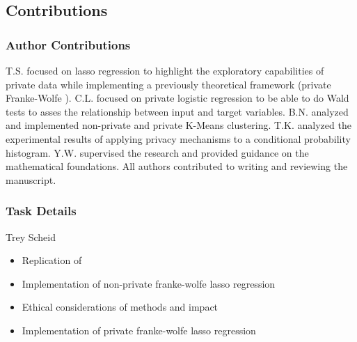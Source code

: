 \documentclass[12pt,letterpaper]{article}
\begin{document}




\clearpage
\makeappendix


\subsection{Contributions}

\subsubsection{Author Contributions}
T.S. focused on lasso regression to highlight the exploratory capabilities of private data while implementing a previously theoretical framework (private Franke-Wolfe \cite{NIPS2015_52d080a3}). C.L. focused on private logistic regression to be able to do Wald tests to asses the relationship between input and target variables. B.N. analyzed and implemented non-private and private K-Means clustering. T.K. analyzed the experimental results of applying privacy mechanisms to a conditional probability histogram. Y.W. supervised the research and provided guidance on the mathematical foundations. All authors contributed to writing and reviewing the manuscript.

\subsubsection{Task Details}

Trey Scheid
\begin{itemize}
    \item Replication of \cite{lassocarbon}
    \item Implementation of non-private franke-wolfe lasso regression
    \item Ethical considerations of methods and impact
    \item Implementation of private franke-wolfe lasso regression
\end{itemize}
\end{document}
